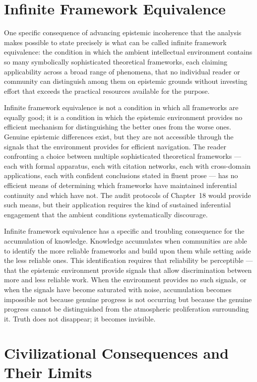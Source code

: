 \documentclass[12pt, openright, twoside]{book}
\begin{document}
\section{Infinite Framework Equivalence}

One specific consequence of advancing epistemic incoherence that the
analysis makes possible to state precisely is what can be called
infinite framework equivalence: the condition in which the ambient
intellectual environment contains so many symbolically sophisticated
theoretical frameworks, each claiming applicability across a broad
range of phenomena, that no individual reader or community can
distinguish among them on epistemic grounds without investing effort
that exceeds the practical resources available for the purpose.

Infinite framework equivalence is not a condition in which all frameworks
are equally good; it is a condition in which the epistemic environment
provides no efficient mechanism for distinguishing the better ones from
the worse ones. Genuine epistemic differences exist, but they are not
accessible through the signals that the environment provides for
efficient navigation. The reader confronting a choice between multiple
sophisticated theoretical frameworks --- each with formal apparatus,
each with citation networks, each with cross-domain applications, each
with confident conclusions stated in fluent prose --- has no efficient
means of determining which frameworks have maintained inferential
continuity and which have not. The audit protocols of Chapter~18 would
provide such means, but their application requires the kind of sustained
inferential engagement that the ambient conditions systematically
discourage.

Infinite framework equivalence has a specific and troubling consequence
for the accumulation of knowledge. Knowledge accumulates when communities
are able to identify the more reliable frameworks and build upon them
while setting aside the less reliable ones. This identification requires
that reliability be perceptible --- that the epistemic environment provide
signals that allow discrimination between more and less reliable work.
When the environment provides no such signals, or when the signals have
become saturated with noise, accumulation becomes impossible not because
genuine progress is not occurring but because the genuine progress cannot
be distinguished from the atmospheric proliferation surrounding it.
Truth does not disappear; it becomes invisible.

\section{Civilizational Consequences and Their Limits}
\end{document}
